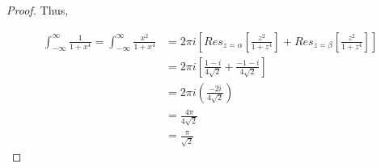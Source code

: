 \documentclass{article}
\begin{document}
\begin{proof}
    Thus, 

    \begin{align*}
        \int_{-\infty}^{\infty} \frac{1}{1 + x^4} = \int_{-\infty}^{\infty} \frac{x^2}{1 + x^4} &= 2 \pi i \left[Res_{z = \alpha}\left[\frac{z^2}{1 + z^4}\right] + Res_{z = \beta}\left[\frac{z^2}{1 + z^4}\right]\right] \\
        &= 2 \pi i \left[\frac{1 - i}{4\sqrt{2}} + \frac{-1 - i}{4\sqrt{2}}\right] \\
        &= 2 \pi i \left(\frac{-2i}{4 \sqrt{2}}\right) \\
        &= \frac{4 \pi}{4 \sqrt{2}} \\ 
        &= \frac{\pi}{\sqrt{2}}
    \end{align*}
\end{proof}

\bigskip
\end{document}
